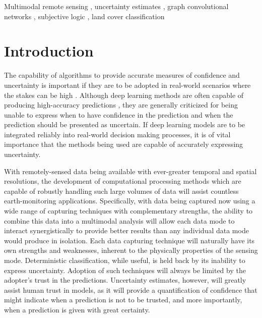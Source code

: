 \documentclass[
twocolumn,
]{ceurart}
\begin{document}
\begin{keywords}
  Multimodal remote sensing \sep
  uncertainty estimates \sep
  graph convolutional networks \sep
  subjective logic \sep
  land cover classification
\end{keywords}

\maketitle

\section{Introduction}
The capability of algorithms to provide accurate measures of confidence and uncertainty is important if they are to be adopted in real-world scenarios where the stakes can be high \cite{Goodman2017}.
Although deep learning methods are often capable of producing high-accuracy predictions \cite{LeCun2015, LiangpeiZhang2016}, they are generally criticized for being unable to express when to have confidence in the prediction and when the prediction should be presented as uncertain.
If deep learning models are to be integrated reliably into real-world decision making processes, it is of vital importance that the methods being used are capable of accurately expressing uncertainty.

With remotely-sensed data being available with ever-greater temporal and spatial resolutions, the development of computational processing methods which are capable of robustly handling such large volumes of data will assist countless earth-monitoring applications.
Specifically, with data being captured now using a wide range of capturing techniques with complementary strengths, the ability to combine this data into a multimodal analysis will allow each data mode to interact synergistically to provide better results than any individual data mode would produce in isolation.
Each data capturing technique will naturally have its own strengths and weaknesses, inherent to the physically properties of the sensing mode.
Deterministic classification, while useful, is held back by its inability to express uncertainty.
Adoption of such techniques will always be limited by the adopter's trust in the predictions.
Uncertainty estimates, however, will greatly assist human trust in models, as it will provide a quantification of confidence that might indicate when a prediction is not to be trusted, and more importantly, when a prediction is given with great certainty.
\end{document}
